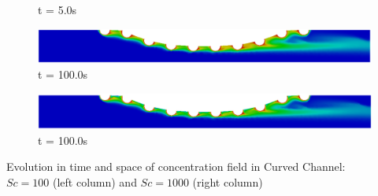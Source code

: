 \begin{frame}
\begin{figure}
\begin{minipage}{.50\linewidth}
      \tiny t = 5.0s
     \end{minipage}
     \begin{minipage}{.50\linewidth}
      \centering
      \includegraphics[scale=0.12]{images/conc100_CurvedStrut8.png}\\
      \tiny t = 100.0s
     \end{minipage}%
     \begin{minipage}{.50\linewidth}
      \centering
      \includegraphics[scale=0.12]{images/conc1000_CurvedStrut8.png}\\
      \tiny t = 100.0s
     \end{minipage}
\end{figure}
\vspace{-0.2cm}
\centering \scriptsize Evolution in time and space of concentration field in Curved Channel:\\
                 $Sc=100$ (left column) and $Sc=1000$ (right column)
\end{frame}


